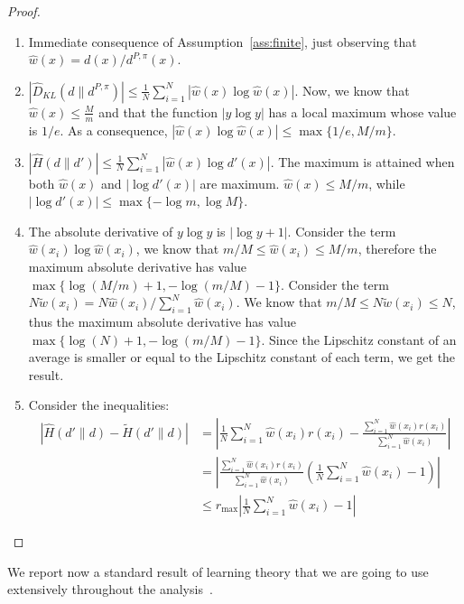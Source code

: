\begin{proof}
\begin{enumerate}
	\item Immediate consequence of Assumption~\ref{ass:finite}, just observing that $\widehat{w}(x) = d(x) / d^{P,\pi}(x)$.
	\item $|\widehat{D}_{KL} (d \| d^{P,\pi}) | \le  \frac{1}{N} \sum_{i=1}^N \left| \widehat{w}(x) \log \widehat{w}(x) \right| $. Now, we know that $\widehat{w}(x) \le \frac{M}{m}$ and that the function $|y\log y|$ has a local maximum whose value is $1/e$. As a consequence, $|\widehat{w}(x) \log \widehat{w}(x)| \le \max\{1/e, M/m\}$.
	\item $|\widehat{H} (d \| d') | \le  \frac{1}{N} \sum_{i=1}^N \left| \widehat{w}(x) \log d'(x) \right| $. The maximum is attained when both $\widehat{w}(x)$ and $|\log d'(x)|$ are maximum. $\widehat{w}(x) \le M/m$, while $|\log d'(x)| \le \max\{-\log m, \log M\}$.
	\item The absolute derivative of $y \log y$ is $|\log y + 1|$. Consider the term $\widehat{w}(x_i) \log \widehat{w}(x_i)$, we know that $m/M \le \widehat{w}(x_i) \le M/m$, therefore the maximum absolute derivative has value $\max\{ \log(M/m)+1, -\log(m/M) - 1 \}$. Consider the term $N \widetilde{w}(x_i) = N \widehat{w}(x_i)/ \sum_{i=1}^N \widehat{w}(x_i) $. We know that $m/M \le N \widetilde{w}(x_i) \le N$, thus the maximum absolute derivative has value $\max\{ \log(N)+1, -\log(m/M) - 1 \}$. Since the Lipschitz constant of an average is smaller or equal to the Lipschitz constant of each term, we get the result.
	\item Consider the inequalities:
	\begin{align*}
\left| \widehat{H} (d' \| d) - \widetilde{H} (d' \| d) \right| &=  \left| \frac{1}{N} \sum_{i=1}^N \widehat{w}(x_i) r(x_i)  - \frac{\sum_{i=1}^N \widehat{w}(x_i) r(x_i)}{\sum_{i=1}^N \widehat{w}(x_i)} \right| \\
& = \left| \frac{\sum_{i=1}^N \widehat{w}(x_i) r(x_i)}{\sum_{i=1}^N \widehat{w}(x_i)} \left( \frac{1}{N} \sum_{i=1}^N \widehat{w}(x_i) - 1 \right) \right| \\
& \le r_{\max} \left| \frac{1}{N} \sum_{i=1}^N \widehat{w}(x_i) - 1\right| 
	\end{align*}
\end{enumerate}
\end{proof}

We report now a standard result of learning theory that we are going to use extensively throughout the analysis~\cite{mohri2012foundations}.


